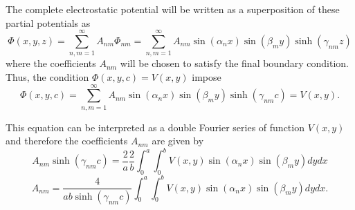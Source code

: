 The complete electrostatic potential will be written as a superposition of these partial potentials as
\begin{equation}
\Phi (x,y,z) = \sum_{n,m = 1}^\infty A_{nm} \Phi_{nm} = \sum_{n,m = 1}^\infty  A_{nm}  \sin (\alpha_n x) \sin (\beta_m y) \sinh (\gamma_{nm} z)
\end{equation}
where the coefficients $A_{nm} $ will be chosen to satisfy the final boundary condition. Thus, the condition $\Phi(x,y,c) = V(x,y)$ impose
\begin{equation}
\Phi (x,y,c)  = \sum_{n,m = 1}^\infty  A_{nm}  \sin (\alpha_n x) \sin (\beta_m y) \sinh (\gamma_{nm} c) = V(x,y).
\end{equation}

This equation can be interpreted as a double Fourier series of function $V(x,y)$ and therefore the coefficients $A_{nm}$ are given by
\begin{equation}
A_{nm} \sinh (\gamma_{nm} c) = \frac{2}{a} \frac{2}{b} \int_0^a \int_0^b V(x,y) \sin (\alpha_n x) \sin (\beta_m y) dy dx
\end{equation}
\begin{equation}
A_{nm}  = \frac{4}{ab \sinh (\gamma_{nm} c)}  \int_0^a \int_0^b V(x,y) \sin (\alpha_n x) \sin (\beta_m y) dy dx.
\end{equation}